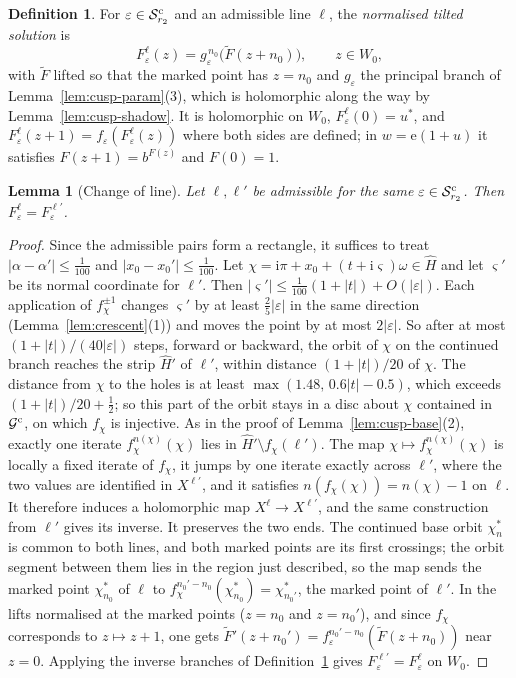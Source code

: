 \documentclass[11pt]{amsart}
\newtheorem{lemma}[theorem]{Lemma}
\theoremstyle{definition}
\newtheorem{definition}[theorem]{Definition}
\newcommand{\eee}{\mathrm{e}}
\newcommand{\ii}{\mathrm{i}}
\begin{document}
\begin{definition}\label{def:cusp-solution}
For $\varepsilon\in\mathcal S^{\rm c}_{r_2}$ and an admissible line $\ell$, the \emph{normalised
tilted solution} is
\[
 F^\ell_\varepsilon(z)=g_\varepsilon^{\,n_0}\bigl(\tilde F(z+n_0)\bigr),\qquad z\in W_0,
\]
with $\tilde F$ lifted so that the marked point has $z=n_0$ and $g_\varepsilon$ the
principal branch of Lemma~\ref{lem:cusp-param}(3), which is holomorphic along
the way by Lemma~\ref{lem:cusp-shadow}.  It is holomorphic on $W_0$,
$F^\ell_\varepsilon(0)=u^*$, and $F^\ell_\varepsilon(z+1)=f_\varepsilon(F^\ell_\varepsilon(z))$ where both sides are
defined; in $w=\eee(1+u)$ it satisfies $F(z+1)=b^{F(z)}$ and $F(0)=1$.
\end{definition}

\begin{lemma}[Change of line]\label{lem:change-line}
Let $\ell,\ell'$ be admissible for the same $\varepsilon\in\mathcal S^{\rm c}_{r_2}$.  Then
$F^\ell_\varepsilon=F^{\ell'}_\varepsilon$.
\end{lemma}

\begin{proof}
Since the admissible pairs form a rectangle, it suffices to treat
$|\alpha-\alpha'|\le\tfrac1{100}$ and $|x_0-x_0'|\le\tfrac1{100}$.  Let
$\chi=\ii\pi+x_0+(t+\ii\varsigma)\omega\in\hat H$ and let $\varsigma'$ be its normal coordinate
for $\ell'$.  Then $|\varsigma'|\le\tfrac1{100}(1+|t|)+O(|\varepsilon|)$.  Each application of
$f_\chi^{\pm1}$ changes $\varsigma'$ by at least $\tfrac25|\varepsilon|$ in the same direction
(Lemma~\ref{lem:crescent}(1)) and moves the point by at most $2|\varepsilon|$.  So
after at most $(1+|t|)/(40|\varepsilon|)$ steps, forward or backward, the orbit of $\chi$
on the continued branch reaches the strip $\hat H'$ of $\ell'$, within distance
$(1+|t|)/20$ of $\chi$.  The distance from $\chi$ to the holes is at least
$\max(1.48,\,0.6|t|-0.5)$, which exceeds $(1+|t|)/20+\tfrac12$; so this part of the
orbit stays in a disc about $\chi$ contained in $\mathcal G^{\rm c}$, on which $f_\chi$ is
injective.  As in the proof of Lemma~\ref{lem:cusp-base}(2), exactly one
iterate $f_\chi^{n(\chi)}(\chi)$ lies in $\hat H'\setminus f_\chi(\ell')$.  The map
$\chi\mapsto f_\chi^{n(\chi)}(\chi)$ is locally a fixed iterate of $f_\chi$, it jumps by one
iterate exactly across $\ell'$, where the two values are identified in
$X^{\ell'}$, and it satisfies $n(f_\chi(\chi))=n(\chi)-1$ on $\ell$.  It therefore induces
a holomorphic map $X^\ell\to X^{\ell'}$, and the same construction from $\ell'$ gives
its inverse.  It preserves the two ends.  The continued base orbit
$\chi^*_n$ is common to both lines, and both marked points are its first
crossings; the orbit segment between them lies in the region just
described, so the map sends the marked point $\chi^*_{n_0}$ of $\ell$ to
$f_\chi^{n_0'-n_0}(\chi^*_{n_0})=\chi^*_{n_0'}$, the marked point of $\ell'$.  In the lifts
normalised at the marked points ($z=n_0$ and $z=n_0'$), and since $f_\chi$
corresponds to $z\mapsto z+1$, one gets $\tilde F'(z+n_0')=f_\varepsilon^{n_0'-n_0}(\tilde F(z+n_0))$
near $z=0$.  Applying the inverse branches of Definition~\ref{def:cusp-solution}
gives $F^{\ell'}_\varepsilon=F^\ell_\varepsilon$ on $W_0$.
\end{proof}
\end{document}
